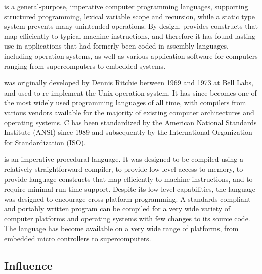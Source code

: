 \documentclass[../languages.tex]{subfiles}
\begin{document}
\label{sec:c}

 is a general-purpose, imperative computer programming languages,
supporting structured programming, lexical variable scope and recursion, while a
static type system prevents many unintended operations. By design, 
provides constructs that map efficiently to typical machine instructions, and
therefore it has found lasting use in applications that had formerly been
coded in assembly languages, including operation systems, as well as various
application software for computers ranging from supercomputers to embedded
systems.

 was originally developed by Dennis Ritchie between 1969 and 1973 at
Bell Labs, and used to re-implement the Unix operation system. It has since becomes one of the most widely used programming languages of all time, with  compilers from various vendors available for the majority of
existing computer architectures and operating systems. C has been standardized
by the American National Standards Institute (ANSI) since 1989 and subsequently
by the International Organization for Standardization (ISO).

 is an imperative procedural language. It was designed to be compiled
using a relatively straightforward compiler, to provide low-level access to
memory, to provide language constructs that map efficiently to machine
instructions, and to require minimal run-time support. Despite its low-level
capabilities, the language was designed to encourage cross-platform
programming. A standards-compliant and portably written  program can
be compiled for a very wide variety of computer platforms and operating systems
with few changes to its source code. The language has become available on a
very wide range of platforms, from embedded micro controllers to supercomputers.

\subsection{Influence}\label{sub:influence}
\end{document}
